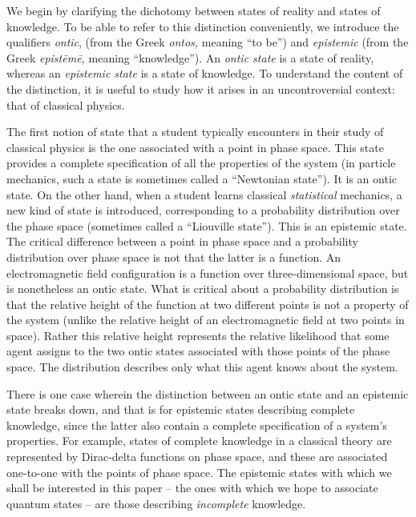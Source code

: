 \documentclass[pra,twocolumn,nofootinbib,showpacs]{revtex4}
\begin{document}
We begin by clarifying the dichotomy between states of reality and states of
knowledge. To be able to refer to this distinction conveniently, we
introduce the qualifiers \emph{ontic}, (from the Greek \emph{ontos, }meaning
``to be'') and \emph{epistemic} (from the Greek \emph{epist\={e}m\={e}, }%
meaning ``knowledge''). An \emph{ontic state} is a state of reality, whereas
an \emph{epistemic state} is a state of knowledge. To understand the content
of the distinction, it is useful to study how it arises in an
uncontroversial context: that of classical physics.

The first notion of state that a student typically encounters in their study
of classical physics is the one associated with a point in phase space. This
state provides a complete specification of all the properties of the system
(in particle mechanics, such a state is sometimes called a ``Newtonian
state''). It is an ontic state. On the other hand, when a student learns
classical \emph{statistical} mechanics, a new kind of state is introduced,
corresponding to a probability distribution over the phase space (sometimes
called a ``Liouville state''). This is an epistemic state. The critical
difference between a point in phase space and a probability distribution
over phase space is not that the latter is a function. An electromagnetic
field configuration is a function over three-dimensional space, but is
nonetheless an ontic state. What is critical about a probability
distribution is that the relative height of the function at two different
points is not a property of the system (unlike the relative height of an
electromagnetic field at two points in space). Rather this relative height
represents the relative likelihood that some agent assigns to the two ontic
states associated with those points of the phase space. The distribution
describes only what this agent knows about the system.

There is one case wherein the distinction between an ontic state and an
epistemic state breaks down, and that is for epistemic states describing
complete knowledge, since the latter also contain a complete specification
of a system's properties. For example, states of complete knowledge in a
classical theory are represented by Dirac-delta functions on phase space,
and these are associated one-to-one with the points of phase space. The
epistemic states with which we shall be interested in this paper -- the ones
with which we hope to associate quantum states -- are those describing \emph{%
incomplete} knowledge.
\end{document}
